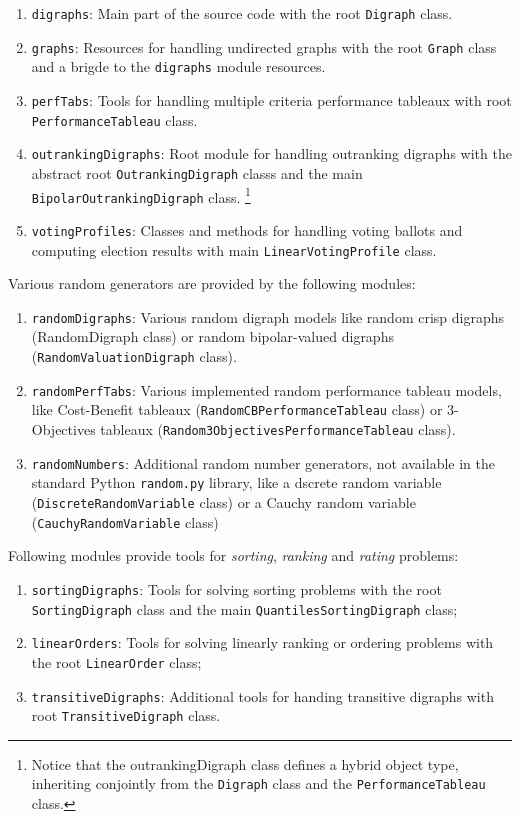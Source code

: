 \begin{enumerate}[leftmargin=0.75cm]
\item \texttt{digraphs}: Main part of the \Digraph source code with the root \texttt{Digraph} class.
\item \texttt{graphs}: Resources for handling undirected graphs with the root \texttt{Graph} class and a brigde to the \texttt{digraphs} module resources.
\item \texttt{perfTabs}: Tools for handling multiple criteria performance tableaux with root \texttt{PerformanceTableau} class.
\item \texttt{outrankingDigraphs}: Root module for handling outranking digraphs with the abstract root \texttt{OutrankingDigraph} classs and the main \texttt{Bipolar\-OutrankingDigraph} class. \footnote{Notice that the outrankingDigraph class defines a hybrid object type, inheriting conjointly from the \texttt{Digraph} class and the \texttt{PerformanceTableau} class.}
\item \texttt{votingProfiles}: Classes and methods for handling voting ballots and computing election results with main \texttt{LinearVotingProfile} class.
\end{enumerate}

\noindent Various random generators are provided by the following modules:

\begin{enumerate}[leftmargin=0.75cm]
\item \texttt{randomDigraphs}: Various random digraph models like random crisp digraphs (RandomDigraph class) or random bipolar-valued digraphs (\texttt{Random\-ValuationDigraph} class).
\item \texttt{randomPerfTabs}: Various implemented random performance tableau models, like Cost-Benefit tableaux (\texttt{RandomCBPerformance\-Tableau} class) or 3-Objectives tableaux (\texttt{Random3ObjectivesPer\-formance\-Tableau} class).
\item \texttt{randomNumbers}: Additional random number generators, not available in the standard Python \texttt{random.py} library, like a dscrete random variable (\texttt{DiscreteRandomVariable} class) or a Cauchy random variable (\texttt{Cau\-chy\-RandomVariable} class)
\end{enumerate}

\noindent Following modules provide tools for \emph{sorting}, \emph{ranking} and \emph{rating} problems:

\begin{enumerate}[leftmargin=0.75cm]
\item \texttt{sortingDigraphs}: Tools for solving sorting problems with the root \texttt{Sor\-tingDigraph} class and the main \texttt{QuantilesSortingDi\-graph} class;
\item \texttt{linearOrders}: Tools for solving linearly ranking or ordering problems with the root \texttt{LinearOrder} class;
\item \texttt{transitiveDigraphs}: Additional tools for handing transitive digraphs with root \texttt{TransitiveDigraph} class.
\end{enumerate}

